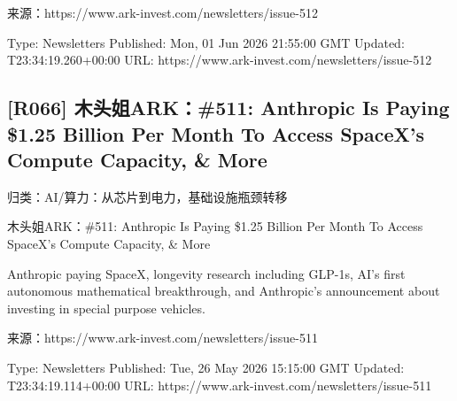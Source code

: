 \documentclass[11pt]{ctexart}
\begin{document}
来源：https://www.ark-invest.com/newsletters/issue-512

Type: Newsletters Published: Mon, 01 Jun 2026 21:55:00 GMT Updated: T23:34:19.260+00:00 URL: https://www.ark-invest.com/newsletters/issue-512

\subsection{[R066] 木头姐ARK：\#511: Anthropic Is Paying \$1.25 Billion Per Month To Access SpaceX’s Compute Capacity, \& More}
{\small\color{refgray}归类：AI/算力：从芯片到电力，基础设施瓶颈转移}

木头姐ARK：\#511: Anthropic Is Paying \$1.25 Billion Per Month To Access SpaceX’s Compute Capacity, \& More

Anthropic paying SpaceX, longevity research including GLP-1s, AI's first autonomous mathematical breakthrough, and Anthropic's announcement about investing in special purpose vehicles.

来源：https://www.ark-invest.com/newsletters/issue-511

Type: Newsletters Published: Tue, 26 May 2026 15:15:00 GMT Updated: T23:34:19.114+00:00 URL: https://www.ark-invest.com/newsletters/issue-511
\end{document}
